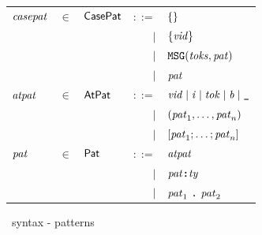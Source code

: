 \documentclass[final]{article}
\begin{document}
\begin{figure}[t]
\begin{small}
\begin{center}
  \begin{tabular}{lllrl}


    $\mathit{casepat}$
    & $\in$
    & $\mathsf{CasePat}$
    & $::=$
    & $\{\}$
    \\
    &&& $\mid$
    & $\{\mathit{vid}\}$
    \\
    &&& $\mid$
    & $\mathtt{MSG}(\mathit{toks},\mathit{pat})$
    \\
    &&& $\mid$
    & $\mathit{pat}$
    \\

    $\mathit{atpat}$
    & $\in$
    & $\mathsf{AtPat}$
    & $::=$
    & $\mathit{vid}
    \mid\mathit{i}
    \mid\mathit{tok}
    \mid\mathit{b}
    \mid\textbf{\texttt{\_}}$
    \\
    &&& $\mid$
    & $(\mathit{pat}_1,\dots,\mathit{pat}_n)$
    \\
    &&& $\mid$
    & $[\mathit{pat}_1;\dots;\mathit{pat}_n]$
    \\

    $\mathit{pat}$
    & $\in$
    & $\mathsf{Pat}$
    & $::=$
    & $\mathit{atpat}$
    \\
    &&& $\mid$
    & $\mathit{pat} \textbf{\texttt{:}} \mathit{ty}$
    \\
    &&& $\mid$
    & $\mathit{pat}_1\ \textbf{\texttt{.}}\ \mathit{pat}_2$
  \end{tabular}
\end{center}
\caption{\eml\ syntax - patterns}
\label{fig:esharp-syntax-patterns}
\end{small}
\end{figure}
\end{document}
